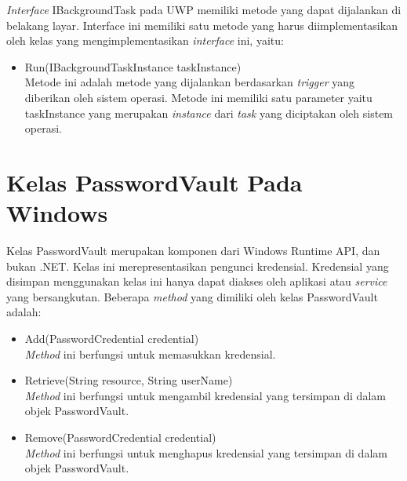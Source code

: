 \textit{Interface} IBackgroundTask pada UWP memiliki metode yang dapat dijalankan di belakang layar\cite{WinAPI:2016}. Interface ini memiliki satu metode yang harus diimplementasikan oleh kelas yang mengimplementasikan \textit{interface} ini, yaitu:

\begin{itemize}
    \item{Run(IBackgroundTaskInstance taskInstance)\\Metode ini adalah metode yang dijalankan berdasarkan \textit{trigger} yang diberikan oleh sistem operasi. Metode ini memiliki satu parameter yaitu taskInstance yang merupakan \textit{instance} dari \textit{task} yang diciptakan oleh sistem operasi.}
\end{itemize}



\section{Kelas PasswordVault Pada Windows}
\label{sec:passwordvault}

Kelas PasswordVault merupakan komponen dari Windows Runtime API, dan bukan .NET\cite{WinAPI:2016}. Kelas ini merepresentasikan pengunci kredensial. Kredensial yang disimpan menggunakan kelas ini hanya dapat diakses oleh aplikasi atau \textit{service} yang bersangkutan. Beberapa \textit{method} yang dimiliki oleh kelas PasswordVault adalah:

\begin{itemize}
    \item{Add(PasswordCredential credential)\\\textit{Method} ini berfungsi untuk memasukkan kredensial.}
    \item{Retrieve(String resource, String userName)\\\textit{Method} ini berfungsi untuk mengambil kredensial yang tersimpan di dalam objek PasswordVault.}
    \item{Remove(PasswordCredential credential)\\\textit{Method} ini berfungsi untuk menghapus kredensial yang tersimpan di dalam objek PasswordVault.}
\end{itemize}

